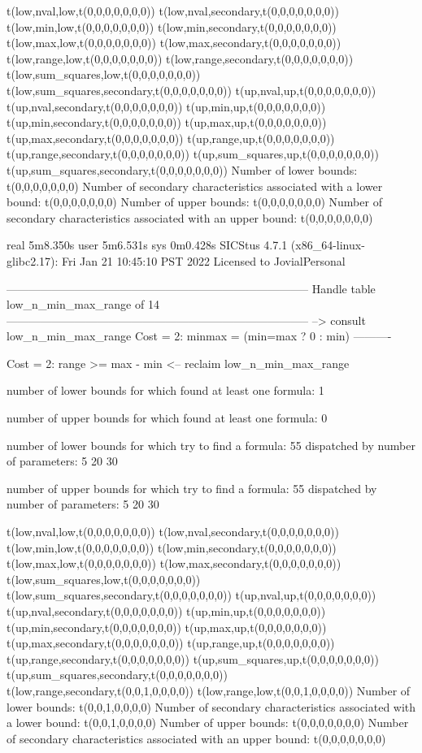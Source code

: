t(low,nval,low,t(0,0,0,0,0,0,0))
t(low,nval,secondary,t(0,0,0,0,0,0,0))
t(low,min,low,t(0,0,0,0,0,0,0))
t(low,min,secondary,t(0,0,0,0,0,0,0))
t(low,max,low,t(0,0,0,0,0,0,0))
t(low,max,secondary,t(0,0,0,0,0,0,0))
t(low,range,low,t(0,0,0,0,0,0,0))
t(low,range,secondary,t(0,0,0,0,0,0,0))
t(low,sum_squares,low,t(0,0,0,0,0,0,0))
t(low,sum_squares,secondary,t(0,0,0,0,0,0,0))
t(up,nval,up,t(0,0,0,0,0,0,0))
t(up,nval,secondary,t(0,0,0,0,0,0,0))
t(up,min,up,t(0,0,0,0,0,0,0))
t(up,min,secondary,t(0,0,0,0,0,0,0))
t(up,max,up,t(0,0,0,0,0,0,0))
t(up,max,secondary,t(0,0,0,0,0,0,0))
t(up,range,up,t(0,0,0,0,0,0,0))
t(up,range,secondary,t(0,0,0,0,0,0,0))
t(up,sum_squares,up,t(0,0,0,0,0,0,0))
t(up,sum_squares,secondary,t(0,0,0,0,0,0,0))
Number of lower bounds:                                             t(0,0,0,0,0,0,0)
Number of secondary characteristics associated with a lower bound:  t(0,0,0,0,0,0,0)
Number of upper bounds:                                             t(0,0,0,0,0,0,0)
Number of secondary characteristics associated with an upper bound: t(0,0,0,0,0,0,0)

real	5m8.350s
user	5m6.531s
sys	0m0.428s
SICStus 4.7.1 (x86_64-linux-glibc2.17): Fri Jan 21 10:45:10 PST 2022
Licensed to JovialPersonal


--------------------------------------------------------------------------------
Handle table low_n_min_max_range of 14
--------------------------------------------------------------------------------
--> consult low_n_min_max_range
Cost =  2:  minmax = (min=max ? 0 : min)
----------

Cost =  2:  range >= max - min
<-- reclaim low_n_min_max_range

number of lower bounds for which found at least one formula: 1

number of upper bounds for which found at least one formula: 0

number of lower bounds for which try to find a formula: 55
dispatched by number of parameters: 5  20  30

number of upper bounds for which try to find a formula: 55
dispatched by number of parameters: 5  20  30

t(low,nval,low,t(0,0,0,0,0,0,0))
t(low,nval,secondary,t(0,0,0,0,0,0,0))
t(low,min,low,t(0,0,0,0,0,0,0))
t(low,min,secondary,t(0,0,0,0,0,0,0))
t(low,max,low,t(0,0,0,0,0,0,0))
t(low,max,secondary,t(0,0,0,0,0,0,0))
t(low,sum_squares,low,t(0,0,0,0,0,0,0))
t(low,sum_squares,secondary,t(0,0,0,0,0,0,0))
t(up,nval,up,t(0,0,0,0,0,0,0))
t(up,nval,secondary,t(0,0,0,0,0,0,0))
t(up,min,up,t(0,0,0,0,0,0,0))
t(up,min,secondary,t(0,0,0,0,0,0,0))
t(up,max,up,t(0,0,0,0,0,0,0))
t(up,max,secondary,t(0,0,0,0,0,0,0))
t(up,range,up,t(0,0,0,0,0,0,0))
t(up,range,secondary,t(0,0,0,0,0,0,0))
t(up,sum_squares,up,t(0,0,0,0,0,0,0))
t(up,sum_squares,secondary,t(0,0,0,0,0,0,0))
t(low,range,secondary,t(0,0,1,0,0,0,0))
t(low,range,low,t(0,0,1,0,0,0,0))
Number of lower bounds:                                             t(0,0,1,0,0,0,0)
Number of secondary characteristics associated with a lower bound:  t(0,0,1,0,0,0,0)
Number of upper bounds:                                             t(0,0,0,0,0,0,0)
Number of secondary characteristics associated with an upper bound: t(0,0,0,0,0,0,0)

